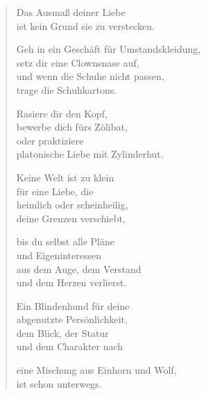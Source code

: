 
\cleartoverso


\begin{verse}

Das Ausmaß deiner Liebe\\
ist kein Grund sie zu verstecken.

Geh in ein Geschäft für Umstandskleidung,\\
setz dir eine Clownsnase auf,\\
und wenn die Schuhe nicht passen,\\
trage die Schuhkartons.

Rasiere dir den Kopf,\\
bewerbe dich fürs Zölibat,\\
oder praktiziere\\
platonische Liebe mit Zylinderhut.

Keine Welt ist zu klein\\
für eine Liebe, die\\
heimlich oder scheinheilig,\\
deine Grenzen verschiebt,

bis du selbst alle Pläne\\
und Eigeninteressen\\
aus dem Auge, dem Verstand\\
und dem Herzen verlierst.

Ein Blindenhund für deine\\
abgenutzte Persönlichkeit,\\
dem Blick, der Statur\\
und dem Charakter nach

eine Mischung aus Einhorn und Wolf,\\
ist schon unterwegs.

\end{verse}

\clearpage


